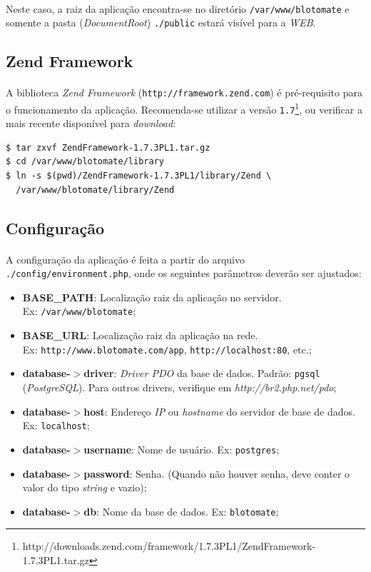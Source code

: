 \documentclass[a4paper,12pt]{article}
\begin{document}
\paragraph{}
Neste caso, a raiz da aplicação encontra-se no diretório \texttt{/var/www/blotomate} e somente a pasta (\emph{DocumentRoot}) \texttt{./public} estará visível para a \emph{WEB}.

\subsection{Zend Framework}

\paragraph{}
A biblioteca \emph{Zend Framework} (\texttt{http://framework.zend.com}) é
pré-requisito para o funcionamento da aplicação. Recomenda-se utilizar a versão
\texttt{1.7}\footnote{http://downloads.zend.com/framework/1.7.3PL1/ZendFramework-1.7.3PL1.tar.gz},
ou verificar a mais recente disponível para \emph{download}:

\begin{verbatim}
$ tar zxvf ZendFramework-1.7.3PL1.tar.gz
$ cd /var/www/blotomate/library
$ ln -s $(pwd)/ZendFramework-1.7.3PL1/library/Zend \
  /var/www/blotomate/library/Zend
\end{verbatim}

\subsection{Configuração}

\paragraph{}
A configuração da aplicação é feita a partir do arquivo
\texttt{./config/environment.php}, onde os seguintes parâmetros deverão ser
ajustados:

\begin{itemize}
\item \textbf{BASE\_PATH}: Localização raiz da aplicação no servidor. \\
Ex: \texttt{/var/www/blotomate};
\item \textbf{BASE\_URL}: Localização raiz da aplicação na rede. \\ 
Ex: \texttt{http://www.blotomate.com/app}, \texttt{http://localhost:80}, etc.;
\item \textbf{database-$>$driver}: \emph{Driver PDO} da base de dados. Padrão:
\texttt{pgsql} (\emph{PostgreSQL}). Para outros drivers, verifique em
\emph{http://br2.php.net/pdo};
\item \textbf{database-$>$host}: Endereço \emph{IP} ou \emph{hostname} do
servidor de base de dados. Ex: \texttt{localhost};
\item \textbf{database-$>$username}: Nome de usuário. Ex: \texttt{postgres};
\item \textbf{database-$>$password}: Senha. (Quando não houver senha, deve
conter o valor do tipo \emph{string} e vazio);
\item \textbf{database-$>$db}: Nome da base de dados. Ex: \texttt{blotomate};
\end{itemize}
\end{document}
